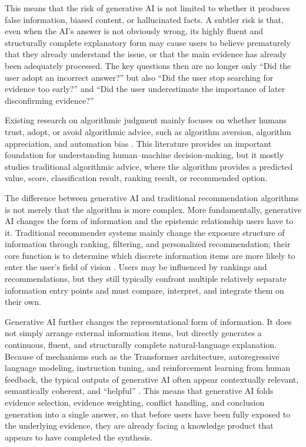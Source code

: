 This means that the risk of generative AI is not limited to whether it produces false information, biased content, or hallucinated facts. A subtler risk is that, even when the AI's answer is not obviously wrong, its highly fluent and structurally complete explanatory form may cause users to believe prematurely that they already understand the issue, or that the main evidence has already been adequately processed. The key questions then are no longer only ``Did the user adopt an incorrect answer?'' but also ``Did the user stop searching for evidence too early?'' and ``Did the user underestimate the importance of later disconfirming evidence?''

Existing research on algorithmic judgment mainly focuses on whether humans trust, adopt, or avoid algorithmic advice, such as algorithm aversion, algorithm appreciation, and automation bias \citep{ParasuramanRiley1997,LeeSee2004,Dietvorst2015,Logg2019}. This literature provides an important foundation for understanding human--machine decision-making, but it mostly studies traditional algorithmic advice, where the algorithm provides a predicted value, score, classification result, ranking result, or recommended option.

The difference between generative AI and traditional recommendation algorithms is not merely that the algorithm is more complex. More fundamentally, generative AI changes the form of information and the epistemic relationship users have to it. Traditional recommender systems mainly change the exposure structure of information through ranking, filtering, and personalized recommendation; their core function is to determine which discrete information items are more likely to enter the user's field of vision \citep{ResnickVarian1997,AdomaviciusTuzhilin2005,Bozdag2013}. Users may be influenced by rankings and recommendations, but they still typically confront multiple relatively separate information entry points and must compare, interpret, and integrate them on their own.

Generative AI further changes the representational form of information. It does not simply arrange external information items, but directly generates a continuous, fluent, and structurally complete natural-language explanation. Because of mechanisms such as the Transformer architecture, autoregressive language modeling, instruction tuning, and reinforcement learning from human feedback, the typical outputs of generative AI often appear contextually relevant, semantically coherent, and ``helpful'' \citep{Vaswani2017,Brown2020,Ouyang2022}. This means that generative AI folds evidence selection, evidence weighting, conflict handling, and conclusion generation into a single answer, so that before users have been fully exposed to the underlying evidence, they are already facing a knowledge product that appears to have completed the synthesis.

